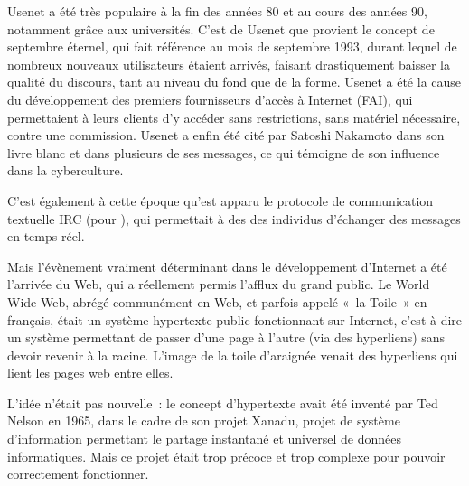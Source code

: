 Usenet a été très populaire à la fin des années 80 et au cours des années 90, notamment grâce aux universités. C'est de Usenet que provient le concept de septembre éternel, qui fait référence au mois de septembre 1993, durant lequel de nombreux nouveaux utilisateurs étaient arrivés, faisant drastiquement baisser la qualité du discours, tant au niveau du fond que de la forme. Usenet a été la cause du développement des premiers fournisseurs d'accès à Internet (FAI), qui permettaient à leurs clients d'y accéder sans restrictions, sans matériel nécessaire, contre une commission. Usenet a enfin été cité par Satoshi Nakamoto dans son livre blanc et dans plusieurs de ses messages, ce qui témoigne de son influence dans la cyberculture. %

C'est également à cette époque qu'est apparu le protocole de communication textuelle IRC (pour ), qui permettait à des des individus d'échanger des messages en temps réel.

Mais l'évènement vraiment déterminant dans le développement d'Internet a été l'arrivée du Web, qui a réellement permis l'afflux du grand public. Le World Wide Web, abrégé communément en Web, et parfois appelé «~la Toile~» en français, était un système hypertexte public fonctionnant sur Internet, c'est-à-dire un système permettant de passer d'une page à l'autre (via des hyperliens) sans devoir revenir à la racine. L'image de la toile d’araignée venait des hyperliens qui lient les pages web entre elles.

L'idée n'était pas nouvelle~: le concept d'hypertexte avait été inventé par Ted Nelson en 1965, dans le cadre de son projet Xanadu, projet de système d'information permettant le partage instantané et universel de données informatiques. Mais ce projet était trop précoce et trop complexe pour pouvoir correctement fonctionner. %

